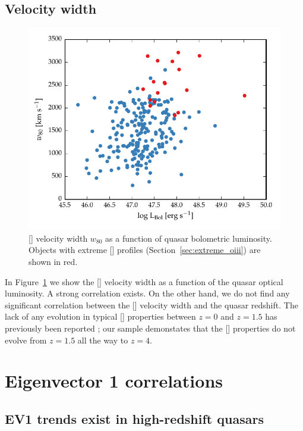 \subsection{Velocity width}

\begin{figure}[t!]
    \centering
    \includegraphics[width=\columnwidth]{figures/chapter04/lum_w80.pdf} 
    \caption[{}]{[] velocity width $w_{80}$ as a function of quasar bolometric luminosity. Objects with extreme [] profiles (Section~\ref{sec:extreme_oiii}) are shown in red.}     
    \label{fig:lum_w80}
\end{figure}

In Figure~\ref{fig:lum_w80} we show the [] velocity width as a function of the quasar optical luminosity.
A strong correlation exists. 
On the other hand, we do not find any significant correlation between the [] velocity width and the quasar redshift. 
The lack of any evolution in typical [] properties between $z=0$ and $z=1.5$ has previously been reported \citep[e.g.][]{harrison16}; our sample demonstates that the [] properties do not evolve from $z=1.5$ all the way to $z=4$. 

\section{Eigenvector 1 correlations}

\subsection{EV1 trends exist in high-redshift quasars}

